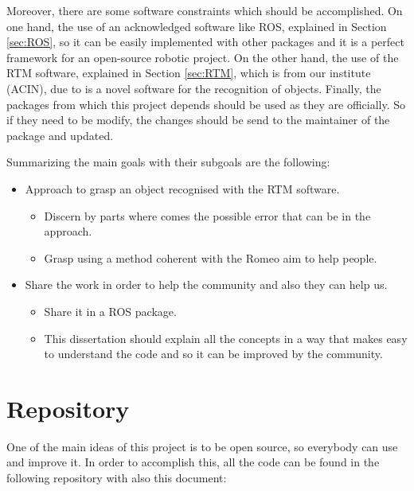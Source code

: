 \documentclass[12pt,a4paper,final,twoside,openright]{report}
\begin{document}
Moreover, there are some software constraints which should be accomplished. On one hand, the use of an acknowledged software like ROS, explained in Section \ref{sec:ROS}, so it can be easily implemented with other packages and it is a perfect framework for an open-source robotic project. On the other hand, the use of the RTM software, explained in Section \ref{sec:RTM}, which is from our institute (ACIN), due to is a novel software for the recognition of objects. Finally, the packages from which this project depends should be used as they are officially. So if they need to be modify, the changes should be send to the maintainer of the package and updated.

Summarizing the main goals with their subgoals are the following:
\begin{itemize}
\item Approach to grasp an object recognised with the RTM software.
\begin{itemize}
\item Discern by parts where comes the possible error that can be in the approach.
\item Grasp using a method coherent with the Romeo aim to help people.
\end{itemize}
\item Share the work in order to help the community and also they can help us.
\begin{itemize}
\item Share it in a ROS package.
\item This dissertation should explain all the concepts in a way that makes easy to understand the code and so it can be improved by the community.
\end{itemize}
\end{itemize}

\vspace{-10pt}
\section{Repository}
\label{sec:repository}

\vspace{-5pt}
One of the main ideas of this project is to be open source, so everybody can use and improve it. In order to accomplish this, all the code can be found in the following repository with also this document:
\end{document}
